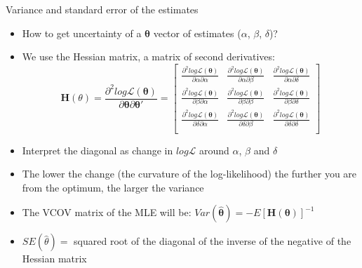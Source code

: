 \documentclass[xcolor=table,dvipsnames]{beamer}
\begin{document}
\begin{frame}{Variance and standard error of the estimates}
\begin{itemize}
\item How to get uncertainty of a $\mathbf{\theta}$ vector of estimates ($\alpha$, $\beta$, $\delta$)? \pause
\item We use the Hessian matrix, a matrix of second derivatives: \pause $$\mathbf{H}(\theta) = \frac{\partial^2log\mathcal{L}(\mathbf{\theta})}{\partial\mathbf{\theta}\partial\mathbf{\theta}'} = \left[
\begin{array}{ccc}
\frac{\partial^2log\mathcal{L}(\mathbf{\theta})}{\partial\alpha\partial\alpha} & \frac{\partial^2log\mathcal{L}(\mathbf{\theta})}{\partial\alpha\partial\beta}  & \frac{\partial^2log\mathcal{L}(\mathbf{\theta})}{\partial\alpha\partial\delta} \\
\frac{\partial^2log\mathcal{L}(\mathbf{\theta})}{\partial\beta\partial\alpha}  & \frac{\partial^2log\mathcal{L}(\mathbf{\theta})}{\partial\beta\partial\beta}   & \frac{\partial^2log\mathcal{L}(\mathbf{\theta})}{\partial\beta\partial\delta}  \\
\frac{\partial^2log\mathcal{L}(\mathbf{\theta})}{\partial\delta\partial\alpha} & \frac{\partial^2log\mathcal{L}(\mathbf{\theta})}{\partial\delta\partial\beta}  & \frac{\partial^2log\mathcal{L}(\mathbf{\theta})}{\partial\delta\partial\delta} \\
\end{array}
\right] $$ \pause
\item Interpret the diagonal as change in $log\mathcal{L}$ around $\alpha$, $\beta$ and $\delta$ \pause
\item The lower the change (the curvature of the log-likelihood) the further you are from the optimum, the larger the variance \pause
\item The VCOV matrix of the MLE will be: $Var(\hat{\mathbf{\theta}})=-E[\mathbf{H}(\mathbf{\theta})]^{-1}$ \pause
\item $SE(\hat{\theta})=$ squared root of the diagonal of the inverse of the negative of the Hessian matrix
\end{itemize}
\end{frame}
\end{document}
